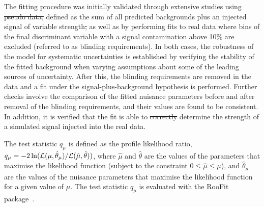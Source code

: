 \documentclass[PAPER, coverpage, atlasdraft=true, texlive=2016, UKenglish]{\ATLASLATEXPATH atlasdoc}
\providecommand{\DIFadd}[1]{{\protect\color{blue}\uwave{#1}}} %
\providecommand{\DIFdel}[1]{{\protect\color{red}\sout{#1}}}                      %
\providecommand{\DIFaddbegin}{} %
\providecommand{\DIFaddend}{} %
\providecommand{\DIFdelbegin}{} %
\providecommand{\DIFdelend}{} %
\begin{document}
The fitting procedure was initially validated through extensive studies using \DIFdelbegin \DIFdel{pseudo data, }\DIFdelend \DIFaddbegin \DIFadd{pseudodata (which is }\DIFaddend defined as the sum of all predicted backgrounds 
plus an injected signal of variable strength\DIFdelbegin \DIFdel{, }\DIFdelend \DIFaddbegin \DIFadd{) }\DIFaddend as well as by performing fits to real data where bins of the final discriminant variable with 
a signal contamination above 10\% are excluded (referred to as blinding requirements).
In both cases, the robustness of the model for systematic uncertainties is established by verifying the stability of the fitted background 
when varying assumptions about some of the leading sources of uncertainty. 
After this, the blinding requirements
are removed in the data and a fit under the signal-plus-background hypothesis is performed. Further checks involve the comparison of the fitted 
nuisance parameters before and after removal of the blinding requirements, and their values are found to be consistent. In addition, it is verified that the 
fit is able to \DIFdelbegin \DIFdel{correctly }\DIFdelend determine the strength of a simulated signal injected into the real data.

The test statistic $q_\mu$ is defined as the profile likelihood ratio, 
$q_\mu = -2\ln({\cal L}(\mu,{\hat{\theta}}_\mu)/{\cal L}(\hat{\mu},\hat{\theta}))$,
where $\hat{\mu}$ and $\hat{\theta}$ are the values of the parameters that
maximise the likelihood function (subject to the constraint $0\leq \hat{\mu} \leq \mu$), and \DIFaddbegin \DIFadd{the }\DIFaddend ${\hat{\theta}}_\mu$ are the values of the
nuisance parameters that maximise the likelihood function for a given value of $\mu$. 
The test statistic $q_\mu$ is evaluated with the {\textsc RooFit} package~\cite{Verkerke:2003ir,RooFitManual}.
\end{document}
